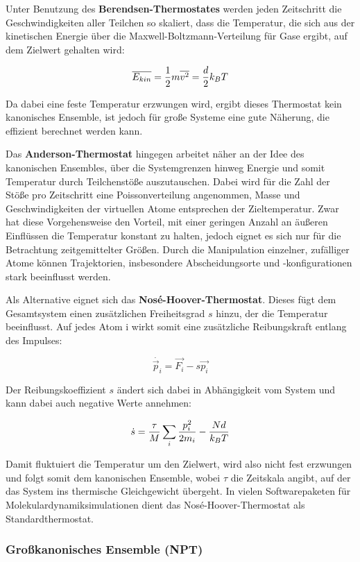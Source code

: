 Unter Benutzung des \textbf{Berendsen-Thermostates} werden jeden Zeitschritt die Geschwindigkeiten aller Teilchen so skaliert, dass die Temperatur, die sich aus der kinetischen Energie über die Maxwell-Boltzmann-Verteilung für Gase ergibt, auf dem Zielwert gehalten wird:

$$
\overline{E_{kin}} = {1\over2} m\overline{v^2} = {d\over2}k_BT
$$


Da dabei eine feste Temperatur erzwungen wird, ergibt dieses Thermostat kein kanonisches Ensemble, ist jedoch für große Systeme eine gute Näherung, die effizient berechnet werden kann.

Das \textbf{Anderson-Thermostat} hingegen arbeitet näher an der Idee des kanonischen Ensembles, über die Systemgrenzen hinweg Energie und somit Temperatur durch Teilchenstöße auszutauschen.
Dabei wird für die Zahl der Stöße pro Zeitschritt eine Poissonverteilung angenommen, Masse und Geschwindigkeiten der virtuellen Atome entsprechen der Zieltemperatur.
Zwar hat diese Vorgehensweise den Vorteil, mit einer geringen Anzahl an äußeren Einflüssen die Temperatur konstant zu halten, jedoch eignet es sich nur für die Betrachtung zeitgemittelter Größen.
Durch die Manipulation einzelner, zufälliger Atome können Trajektorien, insbesondere Abscheidungsorte und -konfigurationen stark beeinflusst werden.

Als Alternative eignet sich das \textbf{Nosé-Hoover-Thermostat}.
Dieses fügt dem Gesamtsystem einen zusätzlichen Freiheitsgrad $s$ hinzu, der die Temperatur beeinflusst.
Auf jedes Atom i wirkt somit eine zusätzliche Reibungskraft entlang des Impulses:

$$
\dot{\vec p_i} = \vec{F_i} - s \vec{p_i}
$$

Der Reibungskoeffizient $s$ ändert sich dabei in Abhängigkeit vom System und kann dabei auch negative Werte annehmen:

$$
\dot s = {\tau \over M} \sum_i{{p_i^2 \over 2m_i} - {Nd \over k_BT}}
$$


Damit fluktuiert die Temperatur um den Zielwert, wird also nicht fest erzwungen und folgt somit dem kanonischen Ensemble, wobei $\tau$ die Zeitskala angibt, auf der das System ins thermische Gleichgewicht übergeht.
In vielen Softwarepaketen für Molekulardynamiksimulationen dient das Nosé-Hoover-Thermostat als Standardthermostat.

\subsubsection{Großkanonisches Ensemble (NPT)}

